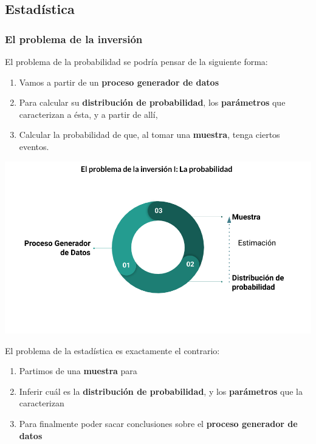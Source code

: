 \documentclass[]{book}
\providecommand{\tightlist}{%
  \setlength{\itemsep}{0pt}\setlength{\parskip}{0pt}}
\begin{document}
\hypertarget{estadistica}{%
\subsection{Estadística}\label{estadistica}}

\hypertarget{el-problema-de-la-inversion}{%
\subsubsection{El problema de la inversión}\label{el-problema-de-la-inversion}}

El problema de la probabilidad se podría pensar de la siguiente forma:

\begin{enumerate}
\def\labelenumi{\arabic{enumi}.}
\tightlist
\item
  Vamos a partir de un \textbf{proceso generador de datos}
\item
  Para calcular su \textbf{distribución de probabilidad}, los \textbf{parámetros} que caracterizan a ésta, y a partir de allí,
\item
  Calcular la probabilidad de que, al tomar una \textbf{muestra}, tenga ciertos eventos.
\end{enumerate}

\includegraphics[width=10.41667in,height=\textheight]{img/problema_inversion_1.png}

El problema de la estadística es exactamente el contrario:

\begin{enumerate}
\def\labelenumi{\arabic{enumi}.}
\tightlist
\item
  Partimos de una \textbf{muestra} para
\item
  Inferir cuál es la \textbf{distribución de probabilidad}, y los \textbf{parámetros} que la caracterizan
\item
  Para finalmente poder sacar conclusiones sobre el \textbf{proceso generador de datos}
\end{enumerate}
\end{document}
